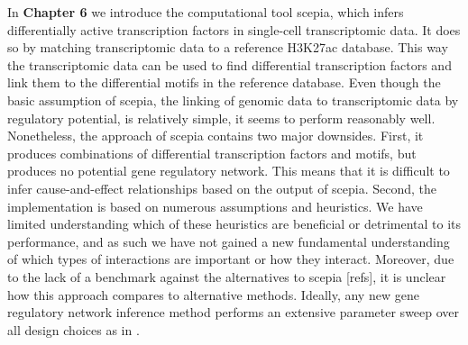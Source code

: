 In \textbf{Chapter 6} we introduce the computational tool scepia, which infers differentially active transcription factors in single-cell transcriptomic data. It does so by matching transcriptomic data to a reference H3K27ac database. This way the transcriptomic data can be used to find differential transcription factors and link them to the differential motifs in the reference database. Even though the basic assumption of scepia, the linking of genomic data to transcriptomic data by regulatory potential\cite{Wang2016}, is relatively simple, it seems to perform reasonably well. Nonetheless, the approach of scepia contains two major downsides. First, it produces combinations of differential transcription factors and motifs, but produces no potential gene regulatory network. This means that it is difficult to infer cause-and-effect relationships based on the output of scepia. Second, the implementation is based on numerous assumptions and heuristics. We have limited understanding which of these heuristics are beneficial or detrimental to its performance, and as such we have not gained a new fundamental understanding of which types of interactions are important or how they interact. Moreover, due to the lack of a benchmark against the alternatives to scepia [refs], it is unclear how this approach compares to alternative methods. Ideally, any new gene regulatory network inference method performs an extensive parameter sweep over all design choices as in \cite{Gschwind2023}.

